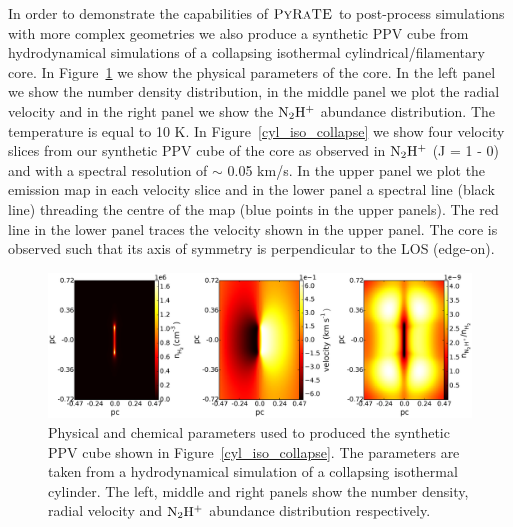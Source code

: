 \documentclass{mn2e}
\begin{document}
In order to demonstrate the capabilities of $\textsc{PyRaTE}$ to post-process simulations with more complex geometries we also produce a synthetic PPV cube from hydrodynamical simulations of a collapsing isothermal cylindrical/filamentary core. In Figure~\ref{cyl_physical_params} we show the physical parameters of the core. In the left panel we show the number density distribution, in the middle panel we plot the radial velocity and in the right panel we show the $\rm{N_2H^+}$ abundance distribution. The temperature is equal to 10 K. In Figure~\ref{cyl_iso_collapse} we show four velocity slices from our synthetic PPV cube of the core as observed in $\rm{N_2H^+}$ (J = 1 - 0) and with a spectral resolution of $\sim$ 0.05 km/s. In the upper panel we plot the emission map in each velocity slice and in the lower panel a spectral line (black line) threading the centre of the map (blue points in the upper panels). The red line in the lower panel traces the velocity shown in the upper panel. The core is observed such that its axis of symmetry is perpendicular to the LOS (edge-on).

\begin{figure}
\includegraphics[width=2.0\columnwidth, clip]{cyl_physical_params.eps}
\caption{Physical and chemical parameters used to produced the synthetic PPV cube shown in Figure~\ref{cyl_iso_collapse}. The parameters are taken from a hydrodynamical simulation of a collapsing isothermal cylinder. The left, middle and right panels show the number density, radial velocity and $\rm{N_2H^{+}}$ abundance distribution respectively.
\label{cyl_physical_params}}
\end{figure}
\end{document}
